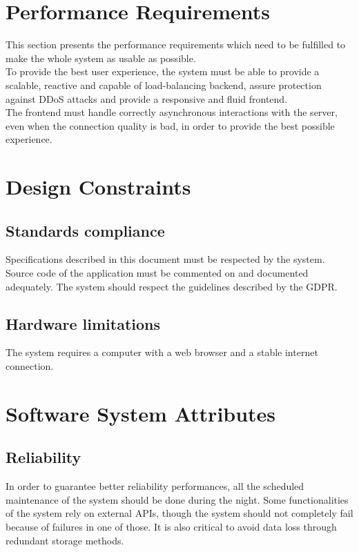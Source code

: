 \clearpage
\section{Performance Requirements}
This section presents the performance requirements which need to be fulfilled to make the
whole system as usable as possible.\\
To provide the best user experience, the system must be able to provide a scalable, reactive 
and capable of load-balancing backend, assure protection against DDoS attacks and provide a 
responsive and fluid frontend.\\
The frontend must handle correctly asynchronous interactions with the server, even when the 
connection quality is bad, in order to provide the best possible experience.\\

\section{Design Constraints}

\subsection{Standards compliance}
Specifications described in this document must be respected by the system. Source code of the application
must be commented on and documented adequately. The system should respect the guidelines described
by the GDPR.\\

\subsection{Hardware limitations}
The system requires a computer with a web browser and a stable internet connection.\\


\section{Software System Attributes}

\subsection{Reliability}
In order to guarantee better reliability performances, all the scheduled maintenance of the system should
be done during the night. Some functionalities of the system rely on external APIs, though the system should 
not completely fail because of failures in one of those. It is also critical to avoid data loss through 
redundant storage methods.

